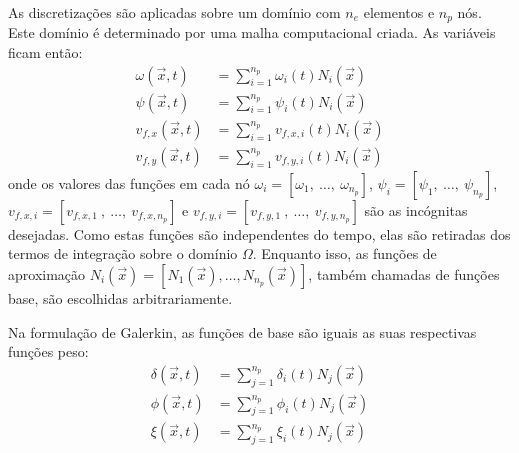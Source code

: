 As discretizações são aplicadas sobre um domínio com $n_e$ elementos e $n_p$ nós.
Este domínio é determinado por uma malha computacional criada.
As variáveis ficam então:
\begin{align}
    \omega(\vec{x}, t) &= \sum_{i=1}^{n_p} \omega_i(t) N_i(\vec{x}) \\
    \psi(\vec{x}, t) &= \sum_{i=1}^{n_p} \psi_i(t) N_i(\vec{x}) \\
    v_{f,x}(\vec{x}, t) &= \sum_{i=1}^{n_p} v_{f,x,i}(t) N_i(\vec{x}) \\
    v_{f,y}(\vec{x}, t) &= \sum_{i=1}^{n_p} v_{f,y,i}(t) N_i(\vec{x}) 
\end{align}
onde os valores das funções em cada nó $\omega_i = [\omega_1,\ \ldots,\ \omega_{n_p}]$, $\psi_i = [\psi_1,\ \ldots,\ \psi_{n_p}]$, $v_{f,x,i} = [v_{f,x,1}\ ,\ \ldots,\ v_{f,x,n_p}]$ e $v_{f,y,i} = [v_{f,y,1}\ ,\ \ldots,\ v_{f,y,n_p}]$ são as incógnitas desejadas.
Como estas funções são independentes do tempo, elas são retiradas dos termos de integração sobre o domínio $\Omega$.
Enquanto isso, as funções de aproximação $N_{i}(\vec{x}) = [N_{1}(\vec{x}), \ldots, N_{n_p}(\vec{x})]$, também chamadas de funções base, são escolhidas arbitrariamente.

Na formulação de Galerkin, as funções de base são iguais as suas respectivas funções peso:
\begin{align}
    \delta(\vec{x}, t) &= \sum_{j=1}^{n_p} \delta_i(t) N_j(\vec{x}) \\
    \phi(\vec{x}, t) &= \sum_{j=1}^{n_p} \phi_i(t) N_j(\vec{x}) \\
    \xi(\vec{x}, t) &= \sum_{j=1}^{n_p} \xi_i(t) N_j(\vec{x})
\end{align}

